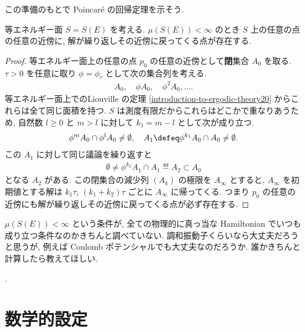 \documentclass[openany, a4paper, oneside]{jsbook}
\begin{document}
{この準備のもとで Poincar\'e の回帰定理を示そう.
\begin{thm}
等エネルギー面 $S = S(E)$ を考える.
$\mu (S(E)) < \infty$ のとき
$S$ 上の任意の点の任意の近傍に, 解が繰り返しその近傍に戻ってくる点が存在する.
\end{thm}
\begin{proof}
等エネルギー面上の任意の点 $p_0$ の任意の近傍として\textbf{閉}集合 $A_0$ を取る.
$\tau > 0$ を任意に取り $\phi = \phi_{\tau}$ として次の集合列を考える.
\begin{align}
 A_0, \quad \phi A_0, \quad \phi^2 A_0, \dots.
\end{align}
等エネルギー面上でのLiouville の定理 \ref{introduction-to-ergodic-theory20} からこれらは全て同じ面積を持つ.
$S$ は測度有限だからこれらはどこかで重なりあうため,
自然数 $l \geq 0$ と $m > l$ に対して $k_1 = m - l$ として次が成り立つ.
\begin{align}
 \phi^m A_0 \cap \phi^l A_0
 \neq
 \emptyset, \quad
 A_1
 \defeq
 \phi^{k_1} A_0 \cap A_0
 \neq
 \emptyset.
\end{align}
この $A_1$ に対して同じ議論を繰り返すと
\begin{align}
 \emptyset
 \neq
 \phi^{k_2} A_1 \cap A_1
 \eqdef
 A_2
 \subset
 A_0
\end{align}
となる $A_2$ がある.
この閉集合の減少列 $(A_k)$ の極限を $A_{\infty}$ とすると,
$A_{\infty}$ を初期値とする解は $k_1 \tau$, $(k_1 + k_2) \tau$ ごとに $A_{\infty}$ に帰ってくる.
つまり $p_0$ の任意の近傍にも解が繰り返しその近傍に戻ってくる点が必ず存在する.
\end{proof}
\begin{rem}
$\mu (S(E)) < \infty$ という条件が, 全ての物理的に真っ当な
Hamiltonian でいつも成り立つ条件なのかきちんと調べていない.
調和振動子くらいなら大丈夫だろうと思うが, 例えば Coulomb ポテンシャルでも大丈夫なのだろうか.
誰かきちんと計算したら教えてほしい.
\end{rem}}.
\section{数学的設定}
\end{document}
